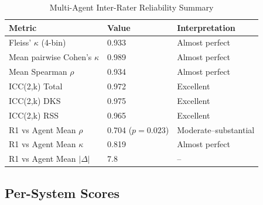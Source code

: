 \documentclass[10pt,a4paper]{article}
\begin{document}
\begin{table}[H]
\centering
\caption{Multi-Agent Inter-Rater Reliability Summary}
\label{tab:irr_summary}
\begin{tabular}{@{}lll@{}}
\toprule
\textbf{Metric} & \textbf{Value} & \textbf{Interpretation} \\
\midrule
Fleiss' $\kappa$ (4-bin) & 0.933 & Almost perfect \\
Mean pairwise Cohen's $\kappa$ & 0.989 & Almost perfect \\
Mean Spearman $\rho$ & 0.934 & Almost perfect \\
ICC(2,k) Total & 0.972 & Excellent \\
ICC(2,k) DKS & 0.975 & Excellent \\
ICC(2,k) RSS & 0.965 & Excellent \\
\midrule
R1 vs Agent Mean $\rho$ & 0.704 ($p=0.023$) & Moderate--substantial \\
R1 vs Agent Mean $\kappa$ & 0.819 & Almost perfect \\
R1 vs Agent Mean $|\Delta|$ & 7.8 & -- \\
\bottomrule
\end{tabular}
\end{table}

\subsection{Per-System Scores}
\end{document}
